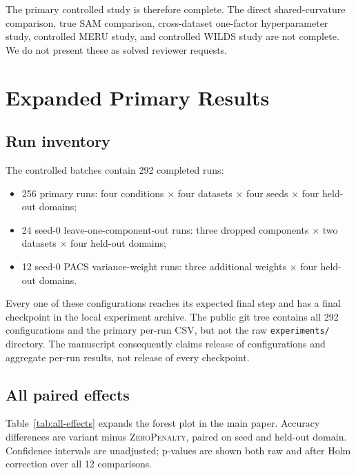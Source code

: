 \documentclass[10pt]{article}
\newcommand{\control}{\textsc{ZeroPenalty}}
\begin{document}
The primary controlled study is therefore complete. The direct shared-curvature
comparison, true SAM comparison, cross-dataset one-factor hyperparameter study,
controlled MERU study, and controlled WILDS study are not complete. We do not
present these as solved reviewer requests.

\section{Expanded Primary Results}
\label{sec:primary}

\subsection{Run inventory}

The controlled batches contain 292 completed runs:
\begin{itemize}
    \item 256 primary runs: four conditions $\times$ four datasets $\times$
          four seeds $\times$ four held-out domains;
    \item 24 seed-0 leave-one-component-out runs: three dropped components
          $\times$ two datasets $\times$ four held-out domains;
    \item 12 seed-0 PACS variance-weight runs: three additional weights
          $\times$ four held-out domains.
\end{itemize}
Every one of these configurations reaches its expected final step and has a
final checkpoint in the local experiment archive. The public git tree contains
all 292 configurations and the primary per-run CSV, but not the raw
\texttt{experiments/} directory. The manuscript consequently claims release of
configurations and aggregate per-run results, not release of every checkpoint.

\subsection{All paired effects}

Table~\ref{tab:all-effects} expands the forest plot in the main paper. Accuracy
differences are variant minus \control, paired on seed and held-out domain.
Confidence intervals are unadjusted; p-values are shown both raw and after Holm
correction over all 12 comparisons.
\end{document}

